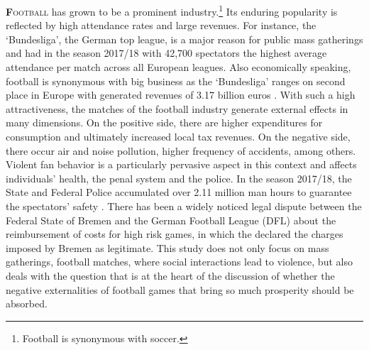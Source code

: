 \documentclass[11pt, a4paper]{article} %
\begin{document}
\lettrine[lines=2,nindent=0pt]{\color{darkgray}\textbf{F}}{ootball} has grown to be a prominent industry.\footnote{Football is synonymous with soccer.} Its enduring popularity is reflected by high attendance rates and large revenues. For instance, the `Bundesliga', the German top league, is a major reason for public mass gatherings and had in the season 2017/18 with 42,700 spectators the highest average attendance per match across all European leagues. Also economically speaking, football is synonymous with big business as the `Bundesliga' ranges on second place in Europe with generated revenues of 3.17 billion euros \citep{deloitte2019report}. With such a high attractiveness, the matches of the football industry generate external effects in many dimensions. On the positive side, there are higher expenditures for consumption and ultimately increased local tax revenues. On the negative side, there occur air and noise pollution, higher frequency of accidents, among others. Violent fan behavior is a particularly pervasive aspect in this context and affects individuals' health, the penal system and the police. In the season 2017/18, the State and Federal Police accumulated over 2.11 million man hours to guarantee the spectators' safety \citep{zis17_18}. There has been a widely noticed legal dispute between the Federal State of Bremen and the German Football League (DFL) about the reimbursement of costs for high risk games, in which the \cite{fac_2019} declared the charges imposed by Bremen as legitimate. This study does not only focus on mass gatherings, football matches, where social interactions lead to violence, but also deals with the question that is at the heart of the discussion of whether the negative externalities of football games that bring so much prosperity should be absorbed. 
\end{document}
